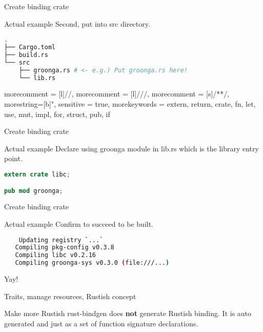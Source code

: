 \documentclass[12pt, unicode]{beamer}
\begin{document}
\begin{frame}[fragile]{Create binding crate}
\begin{block}{Actual example}
Second, put into src directory.
\end{block}
\begin{lstlisting}[language={bash},basicstyle=\ttfamily\Small]
% tree -L 2 .
.
├── Cargo.toml
├── build.rs
└── src
    ├── groonga.rs # <- e.g.) Put groonga.rs here!
    └── lib.rs
\end{lstlisting}
\end{frame}

 {
  morecomment = [l]{//},
  morecomment = [l]{///},
  morecomment = [s]{/*}{*/},
  morestring=[b]",
  sensitive = true,
  morekeywords = {extern, return, crate, fn, let, use, mut, impl, for, struct, pub, if}
}
\begin{frame}[fragile]{Create binding crate}
\begin{block}{Actual example}
Declare using groonga module in lib.rs which is the library entry point.
\end{block}
\begin{lstlisting}[language={Rust},basicstyle=\ttfamily\Small]
extern crate libc;

pub mod groonga;
\end{lstlisting}
\end{frame}





\begin{frame}[fragile]{Create binding crate}
\begin{block}{Actual example}
Confirm to succeed to be built.
\end{block}
\begin{lstlisting}[language={bash},basicstyle=\ttfamily\Small]
% cargo build
    Updating registry `...`
   Compiling pkg-config v0.3.8
   Compiling libc v0.2.16
   Compiling groonga-sys v0.3.0 (file:///...)
\end{lstlisting}
 {\Large Yay!}
\end{frame}

\begin{frame}{Traits, manage resources, Rustish concept}
\begin{block}{Make more Rustish}
rust-bindgen does \textbf {not} generate Rustish binding.
\newline
It is auto generated and just as a set of function signature declarations.
\end{block}
\end{frame}
\end{document}
